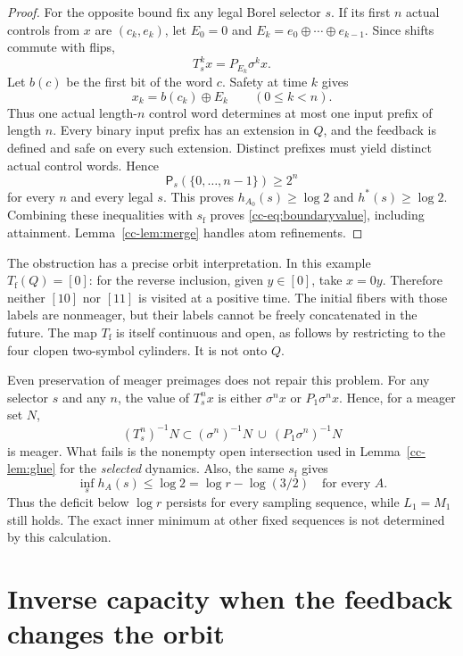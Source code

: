 \documentclass[11pt,reqno]{amsart}
\numberwithin{equation}{section}
\theoremstyle{definition}
\theoremstyle{definition}
\newcommand{\Patt}{\mathsf P}
\newcommand{\hpat}{h^{*}}
\begin{document}
\begin{proof}
For the opposite bound fix any legal Borel selector $s$. If its first
$n$ actual controls from $x$ are $(c_k,e_k)$, let
$E_0=0$ and $E_k=e_0\oplus\cdots\oplus e_{k-1}$. Since shifts commute
with flips,
\[
 T_s^k x=P_{E_k}\sigma^k x.
\]
Let $b(c)$ be the first bit of the word $c$. Safety at time $k$ gives
\begin{equation}\label{cc-eq:decode}
 x_k=b(c_k)\oplus E_k\qquad(0\le k<n).
\end{equation}
Thus one actual length-$n$ control word determines at most one input
prefix of length $n$. Every binary input prefix has an extension in
$Q$, and the feedback is defined and safe on every such extension.
Distinct prefixes must yield distinct actual control words. Hence
\[
 \Patt_s(\{0,\ldots,n-1\})\ge2^n
\]
for every $n$ and every legal $s$. This proves $h_{A_0}(s)\ge\log2$
and $\hpat(s)\ge\log2$. Combining these inequalities with
$s_{\mathrm f}$ proves \eqref{cc-eq:boundaryvalue}, including attainment.
Lemma~\ref{cc-lem:merge} handles atom refinements.
\end{proof}

The obstruction has a precise orbit interpretation. In this example
$T_{\mathrm f}(Q)=[0]$: for the reverse inclusion, given $y\in[0]$,
take $x=0y$. Therefore neither $[10]$ nor $[11]$ is visited at a
positive time. The initial fibers with those labels are nonmeager,
but their labels cannot be freely concatenated in the future.
The map $T_{\mathrm f}$ is itself continuous and open, as follows by
restricting to the four clopen two-symbol cylinders. It is not onto
$Q$.

Even preservation of meager preimages does not repair this problem.
For any selector $s$ and any $n$, the value of $T_s^n x$ is either
$\sigma^n x$ or $P_1\sigma^n x$. Hence, for a meager set $N$,
\[
 (T_s^n)^{-1}N\subset
 (\sigma^n)^{-1}N\ \cup\ (P_1\sigma^n)^{-1}N
\]
is meager. What fails is the nonempty open intersection used in
Lemma~\ref{cc-lem:glue} for the \emph{selected} dynamics. Also, the
same $s_{\mathrm f}$ gives
\[
 \inf_s h_A(s)\le\log2=\log r-\log(3/2)
 \quad\text{for every }A.
\]
Thus the deficit below $\log r$ persists for every sampling sequence,
while $L_1=M_1$ still holds. The exact inner minimum at other fixed
sequences is not determined by this calculation.




\section{Inverse capacity when the feedback changes the orbit}\label{sec:capacity}
\end{document}
